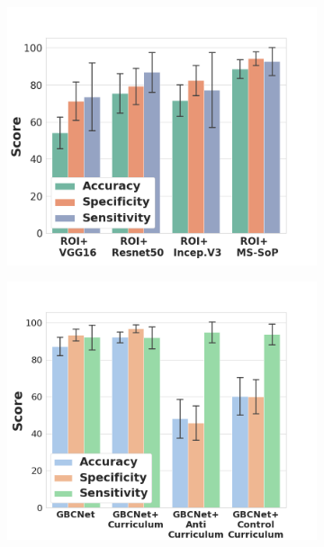 \begin{figure}[t]
	\centering
	\begin{subfigure}[b]{0.23\linewidth}
    \includegraphics[width=\linewidth]{figs/gbcnet/roi_models.png}
    \caption{}
    \label{fig:perf_attn_models}
    \end{subfigure}
	\begin{subfigure}[b]{0.23\linewidth}
		\centering
		\includegraphics[width=\linewidth]{figs/gbcnet/curr_pred.png}
		\caption{}
		\label{fig:ablation1}
	\end{subfigure}

\end{figure}
